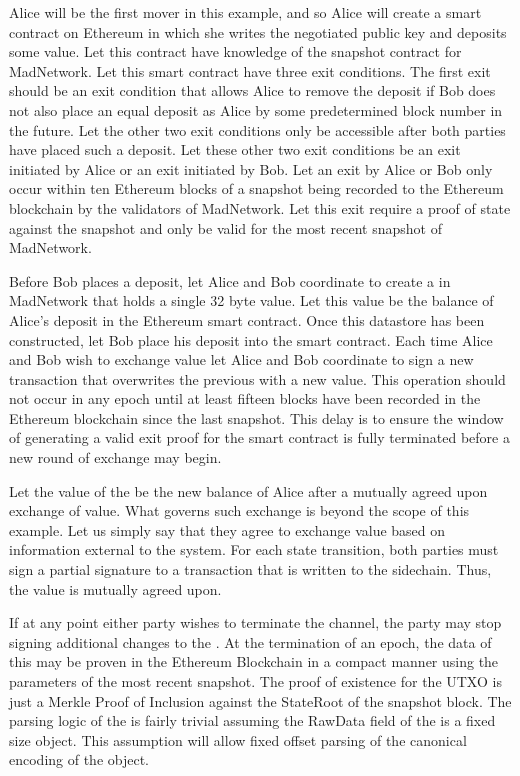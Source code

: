Alice will be the first mover in this example, and so Alice will create
a smart contract on Ethereum in which she writes the negotiated public
key and deposits some value.
Let this contract have knowledge of the snapshot contract for
MadNetwork.
Let this smart contract have three exit conditions.
The first exit should be an exit condition that allows Alice to remove
the deposit if Bob does not also place an equal deposit as Alice by
some predetermined block number in the future.
Let the other two exit conditions only be accessible after both parties
have placed such a deposit.
Let these other two exit conditions be an exit initiated by Alice or an
exit initiated by Bob.
Let an exit by Alice or Bob only occur within ten Ethereum blocks of a
snapshot being recorded to the Ethereum blockchain by the validators of
MadNetwork.
Let this exit require a proof of state against the snapshot and only be
valid for the most recent snapshot of MadNetwork.

Before Bob places a deposit, let Alice and Bob coordinate to create a
\DataStore{} in MadNetwork that holds a single 32 byte value.
Let this value be the balance of Alice’s deposit in the Ethereum
smart contract.
Once this datastore has been constructed, let Bob place his deposit
into the smart contract.
Each time Alice and Bob wish to exchange value let Alice and Bob
coordinate to sign a new transaction that overwrites the previous
\DataStore{} with a new value.
This operation should not occur in any epoch until at least fifteen
blocks have been recorded in the Ethereum blockchain since the last
snapshot.
This delay is to ensure the window of generating a valid exit proof for
the smart contract is fully terminated before a new round of exchange
may begin.

Let the value of the \DataStore{} be the new balance of Alice after a
mutually agreed upon exchange of value.
What governs such exchange is beyond the scope of this example.
Let us simply say that they agree to exchange value based on
information external to the system.
For each state transition, both parties must sign a partial signature
to a transaction that is written to the sidechain.
Thus, the value is mutually agreed upon.

If at any point either party wishes to terminate the channel, the party
may stop signing additional changes to the \DataStore{}.
At the termination of an epoch, the data of this \DataStore{} may be
proven in the Ethereum Blockchain in a compact manner using the
parameters of the most recent snapshot.
The proof of existence for the \DataStore{} UTXO is just a Merkle Proof of
Inclusion against the StateRoot of the snapshot block.
The parsing logic of the \DataStore{} is fairly trivial assuming the
RawData field of the \DataStore{} is a fixed size object.
This assumption will allow fixed offset parsing of the canonical
encoding of the \DataStore{} object.

